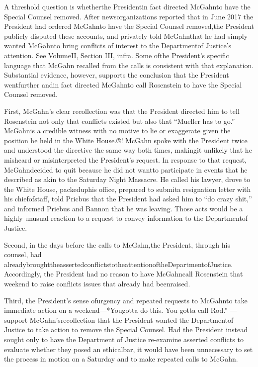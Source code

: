 {A threshold question is whetherthe Presidentin fact directed McGahnto have the Special Counsel removed.
After newsorganizations reported that in June 2017 the President had ordered McGahnto have the
Special Counsel removed,the President publicly disputed these accounts, and privately told McGahnthat he had simply wanted McGahnto bring conflicts of interest to the Departmentof Justice’s attention.
See VolumeII, Section III, infra.
Some ofthe President’s specific language that McGahn recalled from the calls is consistent with that explanation.
Substantial evidence, however, supports the conclusion that the President wentfurther andin fact directed McGahnto call Rosenstein to have the Special Counsel removed.

First, McGahn’s clear recollection was that the President directed him to tell Rosenstein not only that conflicts existed but also that “Mueller has to go.”
McGahnis a credible witness with no motive to lie or exaggerate given the position he held in the White House.®!
McGahn spoke with the President twice and understood the directive the same way both times, makingit unlikely that he misheard or misinterpreted the President’s request.
In response to that request, McGahndecided to quit because he did not wantto participate in events that he described as akin to the Saturday Night Massacre.
He called his lawyer, drove to the White House, packeduphis office, prepared to submita resignation letter with his chiefofstaff, told Pricbus that the President had asked him to “do crazy shit,” and informed Priebus and Bannon that he was leaving.
Those acts would be a highly unusual reaction to a request to convey information to the Departmentof Justice.

Second, in the days before the calls to McGahn,the President, through his counsel, had alreadybroughttheassertedconflictstotheattentionoftheDepartmentofJustice.
Accordingly, the President had no reason to have McGahncall Rosenstein that weekend to raise conflicts issues that already had beenraised.

Third, the President’s sense ofurgency and repeated requests to McGahnto take immediate action on a weekend—*Yougotta do this.
You gotta call Rod.”
—support McGahn’srecollection that the President wanted the Departmentof Justice to take action to remove the Special Counsel.
Had the President instead sought only to have the Department of Justice re-examine asserted conflicts to evaluate whether they posed an ethicalbar, it would have been unnecessary to set the process in motion on a Saturday and to make repeated calls to McGahn.

}
